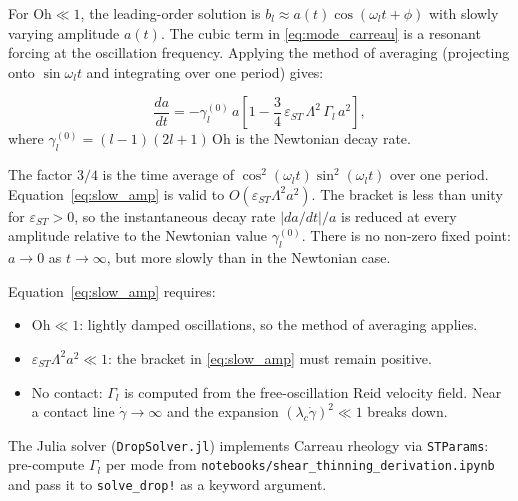 For $\mathrm{Oh} \ll 1$, the leading-order solution is
$b_l \approx a(t)\cos(\omega_l t + \phi)$ with slowly varying amplitude $a(t)$.
The cubic term in \eqref{eq:mode_carreau} is a resonant forcing at the
oscillation frequency. Applying the method of averaging (projecting onto
$\sin\omega_l t$ and integrating over one period) gives:

\begin{keybox}
\begin{equation}
  \frac{da}{dt}
  = -\gamma_l^{(0)}\,a
  \left[1 - \frac{3}{4}\,\varepsilon_{ST}\,\Lambda^2\,\Gamma_l\,a^2\right],
  \label{eq:slow_amp}
\end{equation}
where $\gamma_l^{(0)} = (l-1)(2l+1)\,\mathrm{Oh}$ is the Newtonian decay rate.
\end{keybox}

The factor $3/4$ is the time average of $\cos^2(\omega_l t)\sin^2(\omega_l t)$
over one period. Equation~\eqref{eq:slow_amp} is valid to
$O(\varepsilon_{ST}\Lambda^2 a^2)$. The bracket is less than unity for
$\varepsilon_{ST} > 0$, so the instantaneous decay rate $|da/dt|/a$ is
reduced at every amplitude relative to the Newtonian value $\gamma_l^{(0)}$.
There is no non-zero fixed point: $a\to 0$ as $t\to\infty$, but more slowly
than in the Newtonian case.

\begin{notebox}[Scope]
Equation~\eqref{eq:slow_amp} requires:
\begin{itemize}
  \item $\mathrm{Oh} \ll 1$: lightly damped oscillations, so the method of
        averaging applies.
  \item $\varepsilon_{ST}\Lambda^2 a^2 \ll 1$: the bracket in
        \eqref{eq:slow_amp} must remain positive.
  \item No contact: $\Gamma_l$ is computed from the free-oscillation Reid
        velocity field. Near a contact line $\dot\gamma\to\infty$ and the
        expansion $(\lambda_c\dot\gamma)^2\ll 1$ breaks down.
\end{itemize}
The Julia solver (\texttt{DropSolver.jl}) implements Carreau rheology via
\texttt{STParams}: pre-compute $\Gamma_l$ per mode from
\texttt{notebooks/shear\_thinning\_derivation.ipynb} and pass it to
\texttt{solve\_drop!} as a keyword argument.
\end{notebox}
